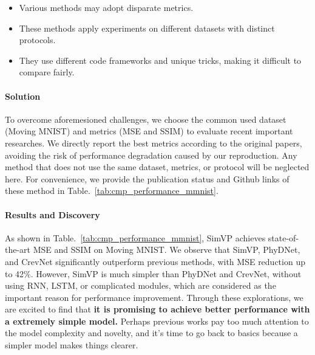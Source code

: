 \documentclass[10pt,twocolumn,letterpaper]{article}
\begin{document}
\begin{itemize}
  \item Various methods may adopt disparate metrics.
  \setlength{\itemsep}{1pt}
  \setlength{\parsep}{1pt}
  \setlength{\parskip}{1pt}
  \item These methods apply experiments on different datasets with distinct protocols.
  \setlength{\itemsep}{1pt}
  \setlength{\parsep}{1pt}
  \setlength{\parskip}{1pt}
  \item They use different code frameworks and unique tricks, making it difficult to compare fairly.
\end{itemize}

\vspace{-5mm}
\paragraph{Solution} To overcome aforemesioned challenges, we choose the common used dataset (Moving MNIST) and metrics (MSE and SSIM) to evaluate recent important researches. We directly report the best metrics according to the original papers, avoiding the risk of performance degradation caused by our reproduction. Any method that does not use the same dataset, metrics, or protocol will be neglected here. For convenience, we provide the publication status and Github links of these method in Table.~\ref{tab:cmp_performance_mmnist}.

\vspace{-2mm}
\paragraph{Results and Discovery} As shown in Table.~\ref{tab:cmp_performance_mmnist}, SimVP achieves state-of-the-art MSE and SSIM on Moving MNIST. We observe that SimVP, PhyDNet, and CrevNet significantly outperform previous methods, with MSE reduction up to 42\%. However, SimVP is much simpler than PhyDNet and CrevNet, without using RNN, LSTM, or complicated modules, which are considered as the important reason for performance improvement. Through these explorations, we are excited to find that \textbf{it is promising to achieve better performance with a extremely simple model.} Perhaps previous works pay too much attention to the model complexity and novelty, and it's time to go back to basics because a simpler model makes things clearer. 
\end{document}
